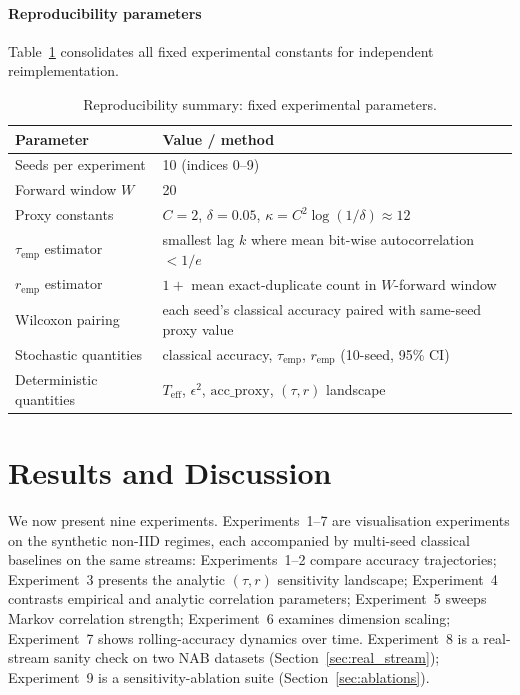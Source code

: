 \documentclass[preprint,12pt,authoryear]{elsarticle}
\newcommand{\Teff}{T_{\mathrm{eff}}}
\begin{document}
\paragraph{Reproducibility parameters} Table~\ref{tab:repro} consolidates all fixed experimental constants for independent reimplementation.

\begin{table}[t]
\centering
\caption{Reproducibility summary: fixed experimental parameters.}
\label{tab:repro}
\begin{tabular}{@{}ll@{}}
\toprule
Parameter & Value / method \\
\midrule
Seeds per experiment & 10 (indices 0--9) \\
Forward window $W$ & 20 \\
Proxy constants & $C = 2$, $\delta = 0.05$, $\kappa = C^2 \log(1/\delta) \approx 12$ \\
$\tau_{\text{emp}}$ estimator & smallest lag $k$ where mean bit-wise autocorrelation $< 1/e$ \\
$r_{\text{emp}}$ estimator & $1 +$ mean exact-duplicate count in $W$-forward window \\
Wilcoxon pairing & each seed's classical accuracy paired with same-seed proxy value \\
Stochastic quantities & classical accuracy, $\tau_{\text{emp}}$, $r_{\text{emp}}$ (10-seed, 95\% CI) \\
Deterministic quantities & $\Teff$, $\epsilon^2$, $\mathrm{acc\_proxy}$, $(\tau,r)$ landscape \\
\bottomrule
\end{tabular}
\end{table}


\section{Results and Discussion}
\label{sec:results}

We now present nine experiments. Experiments~1--7 are visualisation experiments on the synthetic non\nobreakdash-IID regimes, each accompanied by multi-seed classical baselines on the same streams: Experiments~1--2 compare accuracy trajectories; Experiment~3 presents the analytic $(\tau, r)$ sensitivity landscape; Experiment~4 contrasts empirical and analytic correlation parameters; Experiment~5 sweeps Markov correlation strength; Experiment~6 examines dimension scaling; Experiment~7 shows rolling-accuracy dynamics over time. Experiment~8 is a real-stream sanity check on two NAB datasets (Section~\ref{sec:real_stream}); Experiment~9 is a sensitivity-ablation suite (Section~\ref{sec:ablations}).
\end{document}
